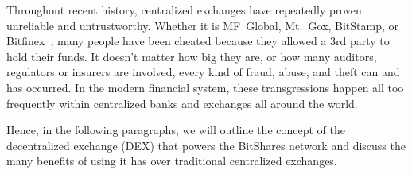 \label{sec:dex}

Throughout recent history, centralized exchanges have repeatedly proven
unreliable and untrustworthy. Whether it is MF~Global, Mt.~Gox, BitStamp, or
Bitfinex~\cite{mfglobal,mtgox,bitstamp,bitfinex}, many people have been cheated
because they allowed a 3rd party to hold their funds. It doesn't matter how big
they are, or how many auditors, regulators or insurers are involved, every kind
of fraud, abuse, and theft can and has occurred. In the modern financial
system, these transgressions happen all too frequently within centralized banks
and exchanges all around the world.

Hence, in the following paragraphs, we will outline the concept of the
decentralized exchange (DEX) that powers the BitShares network and discuss the
many benefits of using it has over traditional centralized exchanges.
